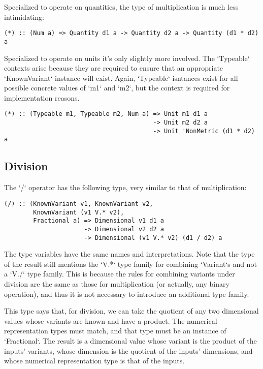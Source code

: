 \documentclass[11pt]{report}
\begin{document}
Specialized to operate on quantities, the type of multiplication is much less intimidating:

\begin{lstlisting}
(*) :: (Num a) => Quantity d1 a -> Quantity d2 a -> Quantity (d1 * d2) a
\end{lstlisting}

Specialized to operate on units it's only slightly more involved. The `Typeable` contexts arise because they are
required to ensure that an appropriate `KnownVariant` instance will exist. Again, `Typeable` isntances exist for all
possible concrete values of `m1` and `m2`, but the context is required for implementation reasons.

\begin{lstlisting}
(*) :: (Typeable m1, Typeable m2, Num a) => Unit m1 d1 a
                                         -> Unit m2 d2 a
                                         -> Unit 'NonMetric (d1 * d2) a
\end{lstlisting}

\subsection{Division}

The `/` operator has the following type, very similar to that of multiplication:

\begin{lstlisting}
(/) :: (KnownVariant v1, KnownVariant v2,
        KnownVariant (v1 V.* v2),
        Fractional a) => Dimensional v1 d1 a
                      -> Dimensional v2 d2 a
                      -> Dimensional (v1 V.* v2) (d1 / d2) a
\end{lstlisting}

The type variables have the same names and interpretations. Note that the type of the result still mentions the
`V.*` type family for combining `Variant`s and not a `V./` type family. This is because the rules for combining variants
under division are the same as those for multiplication (or actually, any binary operation), and thus it is not necessary
to introduce an additional type family.

This type says that, for division, we can take the quotient of any two dimensional values whose variants are known and have a product.
The numerical representation types must match, and that type must be an instance of `Fractional`. The result is a dimensional value
whose variant is the product of the inputs' variants, whose dimension is the quotient of the inputs' dimensions, and whose numerical representation
type is that of the inputs.
\end{document}
